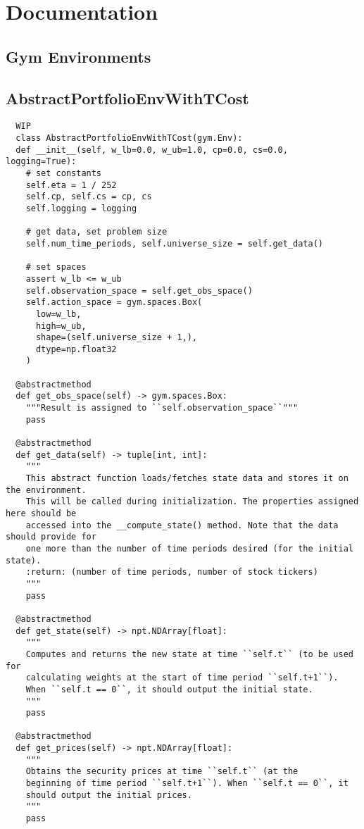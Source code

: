 \chapter{Documentation}

\section{Gym Environments}

\section{AbstractPortfolioEnvWithTCost}

\begin{verbatim}
  WIP
  class AbstractPortfolioEnvWithTCost(gym.Env):
  def __init__(self, w_lb=0.0, w_ub=1.0, cp=0.0, cs=0.0, logging=True):
    # set constants
    self.eta = 1 / 252
    self.cp, self.cs = cp, cs
    self.logging = logging

    # get data, set problem size
    self.num_time_periods, self.universe_size = self.get_data()

    # set spaces
    assert w_lb <= w_ub
    self.observation_space = self.get_obs_space()
    self.action_space = gym.spaces.Box(
      low=w_lb,
      high=w_ub,
      shape=(self.universe_size + 1,),
      dtype=np.float32
    )

  @abstractmethod
  def get_obs_space(self) -> gym.spaces.Box:
    """Result is assigned to ``self.observation_space``"""
    pass

  @abstractmethod
  def get_data(self) -> tuple[int, int]:
    """
    This abstract function loads/fetches state data and stores it on the environment.
    This will be called during initialization. The properties assigned here should be
    accessed into the __compute_state() method. Note that the data should provide for
    one more than the number of time periods desired (for the initial state).
    :return: (number of time periods, number of stock tickers)
    """
    pass

  @abstractmethod
  def get_state(self) -> npt.NDArray[float]:
    """
    Computes and returns the new state at time ``self.t`` (to be used for
    calculating weights at the start of time period ``self.t+1``).
    When ``self.t == 0``, it should output the initial state.
    """
    pass

  @abstractmethod
  def get_prices(self) -> npt.NDArray[float]:
    """
    Obtains the security prices at time ``self.t`` (at the
    beginning of time period ``self.t+1``). When ``self.t == 0``, it
    should output the initial prices.
    """
    pass


\end{verbatim}
